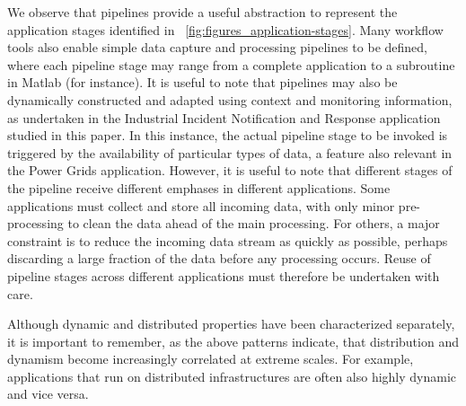We observe that pipelines provide a useful abstraction to represent
the application stages identified in
\figurename~\ref{fig:figures_application-stages}.  Many workflow tools
also enable simple data capture and processing pipelines to be
defined, where each pipeline stage may range from a complete
application to a subroutine in Matlab (for instance).  It is useful to
note that pipelines may also be dynamically constructed and adapted
using context and monitoring information, as undertaken in the
Industrial Incident Notification and Response application studied in
this paper. In this instance, the actual pipeline stage to be invoked
is triggered by the availability of particular types of data, a
feature also relevant in the Power Grids application.  However, it is
useful to note that different stages of the pipeline receive different
emphases in different applications. Some applications must collect and
store all incoming data, with only minor pre-processing to clean the
data ahead of the main processing. For others, a major constraint is
to reduce the incoming data stream as quickly as possible, perhaps
discarding a large fraction of the data before any processing
occurs. Reuse of pipeline stages across different applications must
therefore be undertaken with care.


Although dynamic and distributed properties have been characterized
separately, it is important to remember, as the above patterns
indicate, that distribution and dynamism become increasingly
correlated at extreme scales.  For example, applications that run on
distributed infrastructures are often also highly dynamic and vice
versa.










